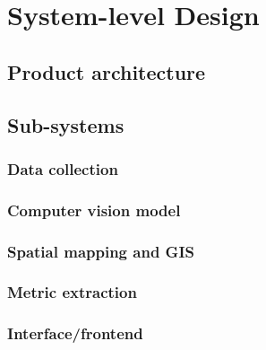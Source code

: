 \chapter{System-level Design}
\label{chap:system-level-design}

\section{Product architecture}

\section{Sub-systems}

\subsection{Data collection}

\subsection{Computer vision model}

\subsection{Spatial mapping and GIS}

\subsection{Metric extraction}

\subsection{Interface/frontend}
